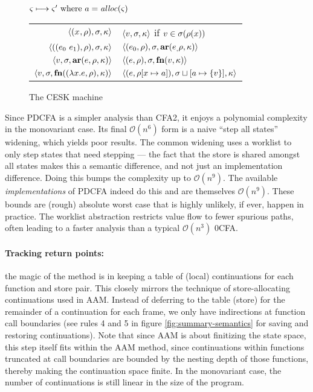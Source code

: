 \documentclass{llncs}
\begin{document}
\begin{figure}
  \centering
  $\varsigma \longmapsto \varsigma' \text{ where } a = \mathit{alloc}(\varsigma)$ \\
  \begin{tabular}{r|l}
    \hline
    $\langle (x^{{}}, \rho), \sigma, \kappa \rangle$
    &
    $\langle v,\sigma,\kappa \rangle$ if $v \in \sigma(\rho(x))$
    \\
    $\langle ((e_{0}\ e_{1}){}, \rho), \sigma, \kappa \rangle$
    &
    $\langle (e_{0}, \rho), \sigma, \mathbf{ar}{}(e_{,}\rho,\kappa) \rangle$
    \\
    $\langle v, \sigma, \mathbf{ar}{}(e,\rho,\kappa) \rangle$
    &
    $\langle (e, \rho), \sigma, \mathbf{fn}{}(v, \kappa) \rangle$
    \\
    $\langle v,\sigma,\mathbf{fn}{}((\lambda{} x. e, \rho), \kappa) \rangle$
    &
    $\langle (e, \rho[x \mapsto a]), \sigma\sqcup[a \mapsto \{ v \}], \kappa \rangle$
  \end{tabular}
  \caption{The CESK machine}
  \label{fig:base-semantics}
\end{figure}

Since PDCFA is a simpler analysis than CFA2, it enjoys a polynomial
complexity in the monovariant case. Its final ${\mathcal O}(n^6)$ form
is a naive ``step all states'' widening, which yields poor
results. The common widening uses a worklist to only step states that
need stepping --- the fact that the store is shared amongst all states
makes this a semantic difference, and not just an implementation
difference. Doing this bumps the complexity up to ${\mathcal
  O}(n^9)$. The available \emph{implementations} of PDCFA indeed do
this and are themselves ${\mathcal O}(n^9)$. These bounds are (rough)
absolute worst case that is highly unlikely, if ever, happen in
practice. The worklist abstraction restricts value flow to fewer
spurious paths, often leading to a faster analysis than a typical
${\mathcal O}(n^3)$ 0CFA.

\paragraph{Tracking return points:} the magic of the method is in
keeping a table of (local) continuations for each function and store
pair. This closely mirrors the technique of store-allocating
continuations used in AAM. Instead of deferring to the table (store)
for the remainder of a continuation for each frame, we only have
indirections at function call boundaries (see rules 4 and 5 in figure
\ref{fig:summary-semantics} for saving and restoring
continuations). Note that since AAM is about finitizing the state
space, this step itself fits within the AAM method, since
continuations within functions truncated at call boundaries are
bounded by the nesting depth of those functions, thereby making the
continuation space finite. In the monovariant case, the number of
continuations is still linear in the size of the program.
\end{document}
